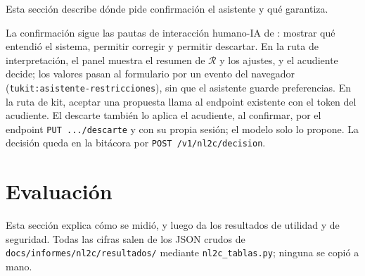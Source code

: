 \documentclass[11pt,letterpaper]{article}
\newcommand{\R}{\mathcal{R}}
\newcommand{\cod}[1]{\texttt{#1}}
\begin{document}
Esta secci\'on describe d\'onde pide confirmaci\'on el asistente y qu\'e garantiza.

La confirmaci\'on sigue las pautas de interacci\'on humano-IA de \citet{amershi2019guidelines}: mostrar qu\'e entendi\'o el
sistema, permitir corregir y permitir descartar. En la ruta de interpretaci\'on, el panel muestra el resumen de $\R$ y
los ajustes, y el acudiente decide; los valores pasan al formulario por un evento del navegador
(\cod{tukit:asistente-restricciones}), sin que el asistente guarde preferencias. En la ruta de kit, aceptar una propuesta
llama al endpoint existente con el token del acudiente. El descarte tambi\'en lo aplica el acudiente, al confirmar, por
el endpoint \cod{PUT .../descarte} y con su propia sesi\'on; el modelo solo lo propone. La decisi\'on queda en la bit\'acora por \cod{POST /v1/nl2c/decision}.

\section{Evaluaci\'on}\label{sec:eval}

Esta secci\'on explica c\'omo se midi\'o, y luego da los resultados de utilidad y de seguridad. Todas las cifras salen de
los JSON crudos de \cod{docs/informes/nl2c/resultados/} mediante \cod{nl2c\_tablas.py}; ninguna se copi\'o a mano.
\end{document}
